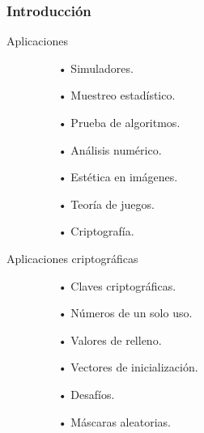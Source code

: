 \documentclass[10pt]{beamer}
\begin{document}
\begin{frame}
    \frametitle{Introducción}
    \begin{block}{Aplicaciones}
        \justifying
        \begin{figure}[!h]
				\begin{minipage}[t]{0.48\textwidth}
					\begin{itemize}
								\justifying
								\item[•] Simuladores.
                                 \item[•] Muestreo estadístico.
                                 \item[•] Prueba de algoritmos.
                                 \item[•] Análisis numérico.
					\end{itemize}
				\end{minipage} \hfill \begin{minipage}[t]{0.48\textwidth}
					\begin{itemize}
								\justifying
								\item[•] Estética en imágenes.
                                 \item[•] Teoría de juegos.
                                 \item[•] Criptografía.
					\end{itemize}
				\end{minipage}
		\end{figure}
	\end{block}
	
     \begin{block}{Aplicaciones criptográficas}
        \justifying
        \begin{figure}[!h]
				\begin{minipage}[t]{0.48\textwidth}
					\begin{itemize}
								\justifying
								\item[•] Claves criptográficas.
                                 \item[•] Números de un solo uso.
                                 \item[•] Valores de relleno.
                                 
					\end{itemize}
				\end{minipage} \hfill \begin{minipage}[t]{0.48\textwidth}
					\begin{itemize}
								\justifying
								\item[•] Vectores de inicialización.
								\item[•] Desafíos.
								\item[•] Máscaras aleatorias.
					\end{itemize}
				\end{minipage}
		\end{figure}
	\end{block}	
	
\end{frame}
\end{document}
